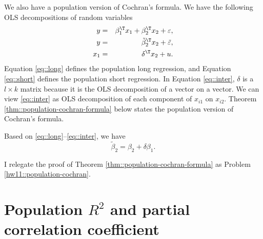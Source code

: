 

We also have a population version of Cochran's formula. 
We have the following OLS decompositions of random variables
\begin{eqnarray}
y &=& \beta_1 ^{\T} x_{1} + \beta_2 ^{\T}x_{2} + \varepsilon , \label{eq::long}\\
y&=&\tilde{\beta}_2 ^{\T} x_{2} + \tilde{\varepsilon}, \label{eq::short}\\
x_{1} &=& \delta ^{\T} x_{2} + u . \label{eq::inter}
\end{eqnarray}
Equation \eqref{eq::long} defines the population long regression, and Equation \eqref{eq::short} defines the population short regression. In Equation \eqref{eq::inter}, $\delta$ is a $l \times k$ matrix because it is the OLS decomposition of a vector on a vector. We can view \eqref{eq::inter} as OLS decomposition of each component of $x_{i1}$ on $x_{i2}$. 
Theorem \ref{thm::population-cochran-formula} below states the population version of Cochran's formula.


\begin{theorem}
\label{thm::population-cochran-formula}
Based on \eqref{eq::long}--\eqref{eq::inter}, we have 
$$
\tilde{\beta}_2 = \beta_2 + \delta \beta_1.
$$
\end{theorem}


I relegate the proof of Theorem \ref{thm::population-cochran-formula} as Problem \ref{hw11::population-cochran}. 



\section{Population $R^2$ and partial correlation coefficient}


